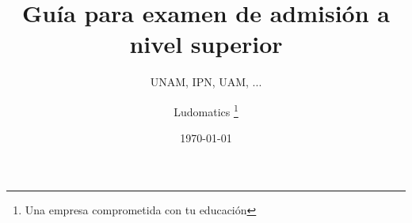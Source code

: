 \documentclass[
 twoside=false %
]{kaobook}
\begin{document}

\titlehead{Guía para ingreso a nivel superior}
\subject{Teoría y ejercicios}

\title[Guía para examen de admisión a nivel superior]{Guía para examen de admisión a nivel superior}
\subtitle{UNAM, IPN, UAM, ...}

\author[Ludomatics]{Ludomatics \thanks{Una empresa comprometida con tu educación}}

\date{\today}

\publishers{Auto publicado}







	
	
	
\end{document}
